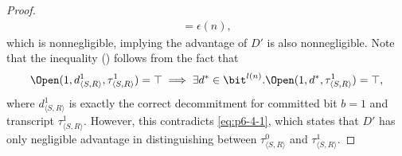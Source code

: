 \begin{answer}[d]
\begin{proof}
\begin{align*}
            = \epsilon(n),
        \end{align*}
        which is nonnegligible, implying the advantage of $D'$ is also nonnegligible. Note that the inequality () follows from the fact that
        \[
            \Open(1, d_{\langle S,R\rangle}^1,\tau_{\langle S,R\rangle}^1)=\top
            \implies \exists d^\ast\in\bit^{l(n)}. \Open(1, d^\ast,\tau_{\langle S,R\rangle}^1)=\top,
        \]
        where $d_{\langle S,R\rangle}^1$ is exactly the correct decommitment for committed bit $b=1$ and transcript $\tau_{\langle S,R\rangle}^1$.
        However, this contradicts \eqref{eq:p6-4-1}, which states that $D'$ has only negligible advantage in distinguishing between $\tau_{\langle S,R\rangle}^0$ and $\tau_{\langle S,R\rangle}^1$.
    \end{proof}



\end{answer}
